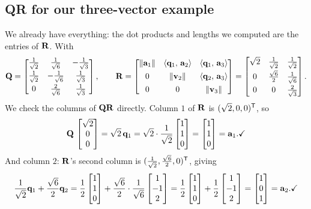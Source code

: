 \subsection{QR for our three-vector example}

We already have everything: the dot products and lengths we computed are the entries of
$\mathbf{R}$. With
\[
  \mathbf{Q}=
  \begin{bmatrix}
    \tfrac{1}{\sqrt2} & \tfrac{1}{\sqrt6} & -\tfrac{1}{\sqrt3}\\[4pt]
    \tfrac{1}{\sqrt2} & -\tfrac{1}{\sqrt6} & \tfrac{1}{\sqrt3}\\[4pt]
    0 & \tfrac{2}{\sqrt6} & \tfrac{1}{\sqrt3}
  \end{bmatrix},
  \qquad
  \mathbf{R}=
  \begin{bmatrix}
    \lVert\mathbf{a}_1\rVert & \langle \mathbf{q}_1,\, \mathbf{a}_2 \rangle & \langle \mathbf{q}_1,\, \mathbf{a}_3 \rangle\\[4pt]
    0 & \lVert\mathbf{v}_2\rVert & \langle \mathbf{q}_2,\, \mathbf{a}_3 \rangle\\[4pt]
    0 & 0 & \lVert\mathbf{v}_3\rVert
  \end{bmatrix}
  =
  \begin{bmatrix}
    \sqrt2 & \tfrac{1}{\sqrt2} & \tfrac{1}{\sqrt2}\\[4pt]
    0 & \tfrac{\sqrt6}{2} & \tfrac{1}{\sqrt6}\\[4pt]
    0 & 0 & \tfrac{2}{\sqrt3}
  \end{bmatrix}.
\]
We check the columns of $\mathbf{Q}\mathbf{R}$ directly. Column
$1$ of $\mathbf{R}$ is $(\sqrt2,0,0)^{\mathsf{T}}$, so
\[
  \mathbf{Q}\,\begin{bmatrix}\sqrt2\\0\\0\end{bmatrix}
  = \sqrt2\,\mathbf{q}_1
  = \sqrt2\cdot\frac{1}{\sqrt2}\begin{bmatrix}1\\1\\0\end{bmatrix}
  = \begin{bmatrix}1\\1\\0\end{bmatrix}
  = \mathbf{a}_1. \checkmark
\]
And column $2$: $\mathbf{R}$'s second column is
$(\tfrac{1}{\sqrt2},\tfrac{\sqrt6}{2},0)^{\mathsf{T}}$, giving
\[
  \frac{1}{\sqrt2}\mathbf{q}_1 + \frac{\sqrt6}{2}\mathbf{q}_2
  = \frac12\begin{bmatrix}1\\1\\0\end{bmatrix} + \frac{\sqrt6}{2}\cdot\frac{1}{\sqrt6}\begin{bmatrix}1\\-1\\2\end{bmatrix}
  = \frac12\begin{bmatrix}1\\1\\0\end{bmatrix} + \frac12\begin{bmatrix}1\\-1\\2\end{bmatrix}
  = \begin{bmatrix}1\\0\\1\end{bmatrix}
  = \mathbf{a}_2. \checkmark
\]

